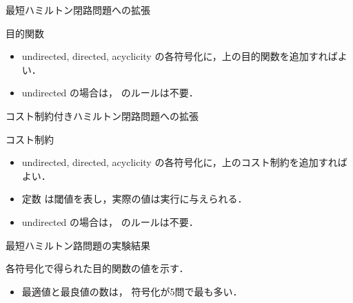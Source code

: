 \documentclass[dvipdfmx]{beamer}
\begin{document}
\begin{frame}[noframenumbering]{最短ハミルトン閉路問題への拡張}
\begin{exampleblock}{目的関数}
 
\end{exampleblock}


\begin{itemize}
\item \textsf{undirected}, \textsf{directed}, \textsf{acyclicity}
  の各符号化に，上の目的関数を追加すればよい．
\item \textsf{undirected} の場合は， のルールは不要．
\end{itemize}
\end{frame}
\begin{frame}[noframenumbering]{コスト制約付きハミルトン閉路問題への拡張}
\begin{exampleblock}{コスト制約}

\end{exampleblock}

\begin{itemize}
\item \textsf{undirected}, \textsf{directed}, \textsf{acyclicity}
  の各符号化に，上のコスト制約を追加すればよい．
\item 定数  は閾値を表し，実際の値は実行に与えられる．
\item \textsf{undirected} の場合は， のルールは不要．
\end{itemize}
\end{frame}
\begin{frame}[noframenumbering]{最短ハミルトン路問題の実験結果}
\begin{block}{}\centering
  各符号化で得られた目的関数の値を示す．    
\end{block}
  
\begin{center}
\end{center}

\begin{itemize}
\item 最適値と最良値の数は，
       符号化が5問で最も多い．
\end{itemize}
\end{frame}
\end{document}
